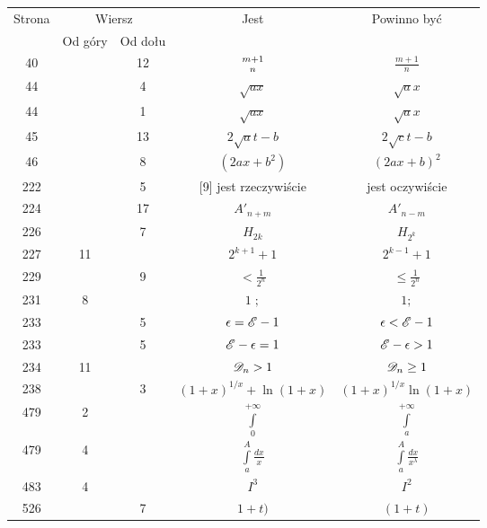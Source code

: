 \documentclass[a4paper,11pt]{article}
\begin{document}
\begin{center}
  \begin{tabular}{|c|c|c|c|c|}
    \hline
    Strona & \multicolumn{2}{c|}{Wiersz} & Jest
                              & Powinno być \\ \cline{2-3}
    & Od góry & Od dołu & & \\
    \hline
    40  & & 12 & ${ m + 1 \atop n }$ & $\frac{ m + 1 }{ n }$ \\
    44  & & \hphantom{0}4 & $\sqrt{ a x }$ & $\sqrt{ a } x$ \\
    44  & & \hphantom{0}1 & $\sqrt{ a x }$ & $\sqrt{ a } x$ \\
    45  & & 13 & $2 \sqrt{ a } t - b$ & $2 \sqrt{ c } t - b$ \\
    46  & & \hphantom{0}8 & $( 2 a x + b^{ 2 } )$ & $( 2 a x + b )^{ 2 }$ \\
    222 & & \hphantom{0}5 & [9] jest rzeczywiście & jest oczywiście \\
    224 & & 17 & $A'_{ n + m }$ & $A'_{ n - m }$ \\
    226 & & \hphantom{0}7 & $H_{ 2k }$ & $H_{ 2^{ k } }$ \\
    227 & 11 & & $2^{ k + 1 } + 1$ & $2^{ k - 1 } + 1$ \\
    229 & & \hphantom{0}9 & $< \frac{ 1 }{ 2^{ n } }$
    & $\leq \frac{ 1 }{ 2^{ n } }$ \\
    231 & \hphantom{0}8 & & $1\; ;$ & $1;$ \\
    233 & & \hphantom{0}5 & $\epsilon = \mathcal{E} - 1$ & $\epsilon < \mathcal{E} - 1$ \\
    233 & & \hphantom{0}5 & $\mathcal{E} - \epsilon = 1$ & $\mathcal{E} - \epsilon > 1$ \\
    234 & 11 & & $\mathcal{D}_{ n } > 1$ & $\mathcal{D}_{ n } \geq 1$ \\
    238 & & \hphantom{0}3 & $( 1 + x )^{ 1 / x } + \ln( 1 + x )$
           & $( 1 + x )^{ 1 / x } \ln( 1 + x )$ \\
           479 & \hphantom{0}2 & & $\int\limits_{ 0 }^{ +\infty }$
           & $\int\limits_{ a }^{ +\infty }$ \\[0.8em]
           479 & \hphantom{0}4 & & $\int\limits_{ a }^{ A } \frac{ dx }{ x }$
           & $\int\limits_{ a }^{ A } \frac{ dx }{ x^{ \lambda } }$ \\[0.5em]
           483 & \hphantom{0}4 & & $I^{ 3 }$ & $I^{ 2 }$ \\
           526 & & \hphantom{0}7 & $1 + t)$ & $( 1 + t )$ \\
    \hline
  \end{tabular}

\end{center}
\end{document}
